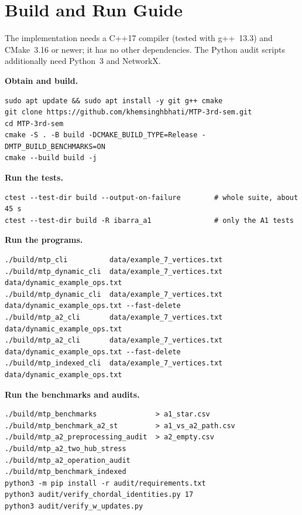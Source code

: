 \documentclass[11pt,a4paper,oneside]{report}
\theoremstyle{plain}
\theoremstyle{definition}
\theoremstyle{remark}
\begin{document}
\chapter{Build and Run Guide}\label{app:build}
The implementation needs a C++17 compiler (tested with g++~13.3) and CMake~3.16 or newer; it has
no other dependencies. The Python audit scripts additionally need Python~3 and NetworkX.

\noindent\textbf{Obtain and build.}\par\nobreak
\begin{lstlisting}[style=shell]
sudo apt update && sudo apt install -y git g++ cmake
git clone https://github.com/khemsinghbhati/MTP-3rd-sem.git
cd MTP-3rd-sem
cmake -S . -B build -DCMAKE_BUILD_TYPE=Release -DMTP_BUILD_BENCHMARKS=ON
cmake --build build -j
\end{lstlisting}

\noindent\textbf{Run the tests.}\par\nobreak
\begin{lstlisting}[style=shell]
ctest --test-dir build --output-on-failure        # whole suite, about 45 s
ctest --test-dir build -R ibarra_a1               # only the A1 tests
\end{lstlisting}

\noindent\textbf{Run the programs.}\par\nobreak
\begin{lstlisting}[style=shell]
./build/mtp_cli          data/example_7_vertices.txt
./build/mtp_dynamic_cli  data/example_7_vertices.txt data/dynamic_example_ops.txt
./build/mtp_dynamic_cli  data/example_7_vertices.txt data/dynamic_example_ops.txt --fast-delete
./build/mtp_a2_cli       data/example_7_vertices.txt data/dynamic_example_ops.txt
./build/mtp_a2_cli       data/example_7_vertices.txt data/dynamic_example_ops.txt --fast-delete
./build/mtp_indexed_cli  data/example_7_vertices.txt data/dynamic_example_ops.txt
\end{lstlisting}

\noindent\textbf{Run the benchmarks and audits.}\par\nobreak
\begin{lstlisting}[style=shell]
./build/mtp_benchmarks              > a1_star.csv
./build/mtp_benchmark_a2_st         > a1_vs_a2_path.csv
./build/mtp_a2_preprocessing_audit  > a2_empty.csv
./build/mtp_a2_two_hub_stress
./build/mtp_a2_operation_audit
./build/mtp_benchmark_indexed
python3 -m pip install -r audit/requirements.txt
python3 audit/verify_chordal_identities.py 17
python3 audit/verify_w_updates.py
\end{lstlisting}
\end{document}
